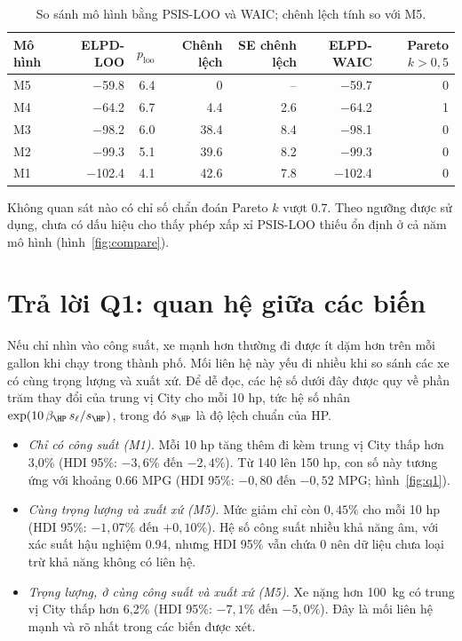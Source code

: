 \documentclass[12pt,a4paper]{report}
\begin{document}
\begin{table}[tp]
  \centering
  \caption{So sánh mô hình bằng PSIS-LOO và WAIC; chênh lệch tính so với M5.}
  \label{tab:compare}
  \begin{tabular}{lrrrrrr}
    \toprule
    Mô hình & ELPD-LOO & $p_{\text{loo}}$ & Chênh lệch & SE chênh lệch & ELPD-WAIC & Pareto $k > 0{,}5$ \\
    \midrule
    M5 & \num{-59.8}  & \num{6.4} & 0           & --         & \num{-59.7}  & 0 \\
    M4 & \num{-64.2}  & \num{6.7} & \num{4.4}   & \num{2.6}  & \num{-64.2}  & 1 \\
    M3 & \num{-98.2}  & \num{6.0} & \num{38.4}  & \num{8.4}  & \num{-98.1}  & 0 \\
    M2 & \num{-99.3}  & \num{5.1} & \num{39.6}  & \num{8.2}  & \num{-99.3}  & 0 \\
    M1 & \num{-102.4} & \num{4.1} & \num{42.6}  & \num{7.8}  & \num{-102.4} & 0 \\
    \bottomrule
  \end{tabular}
\end{table}

Không quan sát nào có chỉ số chẩn đoán Pareto $k$ vượt \num{0.7}. Theo ngưỡng
được sử dụng, chưa có dấu hiệu cho thấy phép xấp xỉ PSIS-LOO thiếu ổn định ở
cả năm mô hình (hình~\ref{fig:compare}).


\section{Trả lời Q1: quan hệ giữa các biến}
\label{sec:q1}

Nếu chỉ nhìn vào công suất, xe mạnh hơn thường đi được ít dặm hơn trên mỗi
gallon khi chạy trong thành phố. Mối liên hệ này yếu đi nhiều khi so sánh các xe
có cùng trọng lượng và xuất xứ. Để dễ đọc, các hệ số dưới đây được quy về phần
trăm thay đổi của trung vị City cho mỗi 10 hp, tức hệ số nhân
$\exp(10\, \beta_{\HP}\, s_\ell / s_{\HP})$, trong đó $s_{\HP}$ là độ lệch chuẩn
của HP.

\begin{itemize}
  \item \emph{Chỉ có công suất (M1).} Mỗi 10 hp tăng thêm đi kèm trung vị City
    thấp hơn 3{,}0\% (HDI 95\%: $-3{,}6\%$ đến $-2{,}4\%$). Từ 140 lên 150 hp,
    con số này tương ứng với khoảng \num{0.66} MPG (HDI 95\%: $-0{,}80$ đến
    $-0{,}52$ MPG; hình~\ref{fig:q1}).
  \item \emph{Cùng trọng lượng và xuất xứ (M5).} Mức giảm chỉ còn
    $0{,}45\%$ cho mỗi 10 hp (HDI 95\%: $-1{,}07\%$ đến $+0{,}10\%$). Hệ số
    công suất nhiều khả năng âm, với xác suất hậu nghiệm \num{0.94}, nhưng HDI
    95\% vẫn chứa 0 nên dữ liệu chưa loại trừ khả năng không có liên hệ.
  \item \emph{Trọng lượng, ở cùng công suất và xuất xứ (M5).} Xe nặng hơn
    \SI{100}{kg} có trung vị City thấp hơn 6{,}2\% (HDI 95\%: $-7{,}1\%$ đến
    $-5{,}0\%$). Đây là mối liên hệ mạnh và rõ nhất trong các biến được xét.
\end{itemize}
\end{document}
